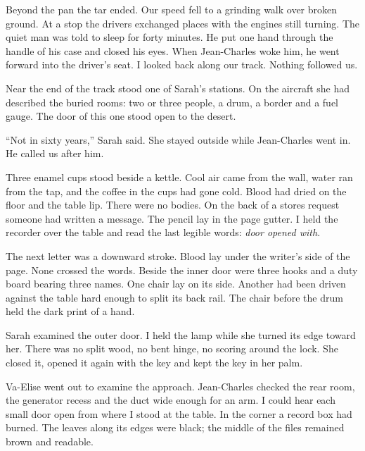 Beyond the pan the tar ended. Our speed fell to a grinding walk over broken ground. At a stop the drivers exchanged places with the engines still turning. The quiet man was told to sleep for forty minutes. He put one hand through the handle of his case and closed his eyes. When Jean-Charles woke him, he went forward into the driver's seat. I looked back along our track. Nothing followed us.\par

\ornament

Near the end of the track stood one of Sarah's stations. On the aircraft she had described the buried rooms: two or three people, a drum, a border and a fuel gauge. The door of this one stood open to the desert.\par

``Not in sixty years,'' Sarah said. She stayed outside while Jean-Charles went in. He called us after him.\par

Three enamel cups stood beside a kettle. Cool air came from the wall, water ran from the tap, and the coffee in the cups had gone cold. Blood had dried on the floor and the table lip. There were no bodies. On the back of a stores request someone had written a message. The pencil lay in the page gutter. I held the recorder over the table and read the last legible words: \emph{door opened with}.\par

The next letter was a downward stroke. Blood lay under the writer's side of the page. None crossed the words. Beside the inner door were three hooks and a duty board bearing three names. One chair lay on its side. Another had been driven against the table hard enough to split its back rail. The chair before the drum held the dark print of a hand.\par

Sarah examined the outer door. I held the lamp while she turned its edge toward her. There was no split wood, no bent hinge, no scoring around the lock. She closed it, opened it again with the key and kept the key in her palm.\par

Va-Elise went out to examine the approach. Jean-Charles checked the rear room, the generator recess and the duct wide enough for an arm. I could hear each small door open from where I stood at the table. In the corner a record box had burned. The leaves along its edges were black; the middle of the files remained brown and readable.\par

